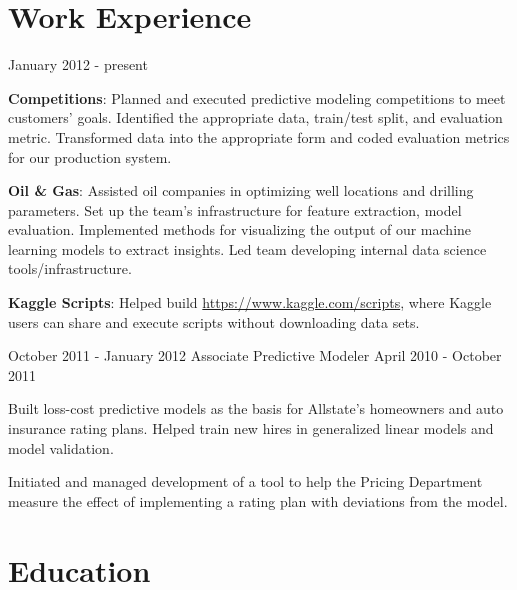 \documentclass[letterpaper]{resume}
\author{David J. Chudzicki}
\begin{document}
\maketitle

\section{Work Experience}

{January 2012 - present}            


\begin{compactitem}
\item \textbf{Competitions}: Planned and executed predictive modeling competitions to meet customers' goals. Identified the appropriate data, train/test split, and evaluation metric. Transformed data into the appropriate form and coded evaluation metrics for our production system.
\item \textbf{Oil \& Gas}: Assisted oil companies in optimizing well locations and drilling parameters. Set up the team's infrastructure for feature extraction, model evaluation. Implemented methods for visualizing the output of our machine learning models to extract insights. Led team developing internal data science tools/infrastructure.
\item \textbf{Kaggle Scripts}: Helped build \href{https://www.kaggle.com/scripts}{https://www.kaggle.com/scripts}, where Kaggle users can share and execute scripts without downloading data sets.
\end{compactitem}


{October 2011 - January 2012}
{Associate Predictive Modeler}
{April 2010 - October 2011}


\begin{compactitem}
\item Built loss-cost predictive models as the basis for
Allstate's homeowners and auto insurance rating
plans. Helped train new hires in generalized linear models
and model validation. 
\item Initiated and managed
development of a tool to help the Pricing Department measure
the effect of implementing a rating plan with deviations from the model.
\end{compactitem}

\section{Education}
\end{document}
